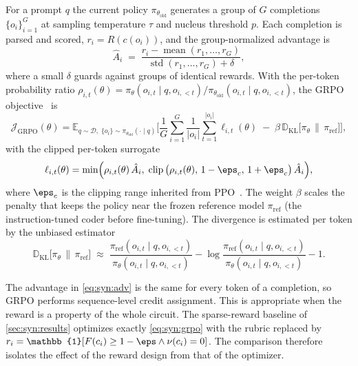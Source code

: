 For a prompt $q$ the current policy $\pi_{\theta_{\mathrm{old}}}$ generates a group of $G$ completions $\{o_i\}_{i=1}^{G}$ at sampling temperature $\tau$ and nucleus threshold $p$. Each completion is parsed and scored, $r_i=R(c(o_i))$, and the group-normalized advantage is
\begin{equation}\label{eq:syn:adv}
  \hat A_i \;=\; \frac{r_i-\operatorname{mean}(r_1,\dots,r_G)}{\operatorname{std}(r_1,\dots,r_G)+\delta},
\end{equation}
where a small $\delta$ guards against groups of identical rewards. With the per-token probability ratio $\rho_{i,t}(\theta)=\pi_\theta(o_{i,t}\mid q,o_{i,<t})/\pi_{\theta_{\mathrm{old}}}(o_{i,t}\mid q,o_{i,<t})$, the GRPO objective~\cite{shao2024deepseekmath} is
\begin{equation}\label{eq:syn:grpo}
  \mathcal{J}_{\mathrm{GRPO}}(\theta)=
  \mathbb{E}_{q\sim\mathcal{D},\;\{o_i\}\sim\pi_{\theta_{\mathrm{old}}}(\cdot\mid q)}
  \Bigg[\frac{1}{G}\sum_{i=1}^{G}\frac{1}{|o_i|}\sum_{t=1}^{|o_i|}\ell_{i,t}(\theta)
  \;-\;\beta\, \mathbb{D}_{\mathrm{KL}}\big[\pi_\theta\,\big\|\,\pi_{\mathrm{ref}}\big]\Bigg],
\end{equation}
with the clipped per-token surrogate
\begin{equation}\label{eq:syn:clip}
  \ell_{i,t}(\theta)=\min\!\Big(\rho_{i,t}(\theta)\,\hat A_i,\;
  \operatorname{clip}\big(\rho_{i,t}(\theta),\,1-\eps_{c},\,1+\eps_{c}\big)\,\hat A_i\Big),
\end{equation}
where $\eps_c$ is the clipping range inherited from PPO~\cite{schulman2017ppo}. The weight $\beta$ scales the penalty that keeps the policy near the frozen reference model $\pi_{\mathrm{ref}}$ (the instruction-tuned coder before fine-tuning). The divergence is estimated per token by the unbiased estimator
\begin{equation}\label{eq:syn:kl}
  \mathbb{D}_{\mathrm{KL}}\big[\pi_\theta\,\big\|\,\pi_{\mathrm{ref}}\big]
  \;\approx\; \frac{\pi_{\mathrm{ref}}(o_{i,t}\mid q,o_{i,<t})}{\pi_\theta(o_{i,t}\mid q,o_{i,<t})}
  -\log\frac{\pi_{\mathrm{ref}}(o_{i,t}\mid q,o_{i,<t})}{\pi_\theta(o_{i,t}\mid q,o_{i,<t})}-1 .
\end{equation}

The advantage in \cref{eq:syn:adv} is the same for every token of a completion, so GRPO performs sequence-level credit assignment. This is appropriate when the reward is a property of the whole circuit. The sparse-reward baseline of \cref{sec:syn:results} optimizes exactly \cref{eq:syn:grpo} with the rubric replaced by $r_i=\mathbb{1}[F(c_i)\ge 1-\eps \wedge \nu(c_i)=0]$. The comparison therefore isolates the effect of the reward design from that of the optimizer.


